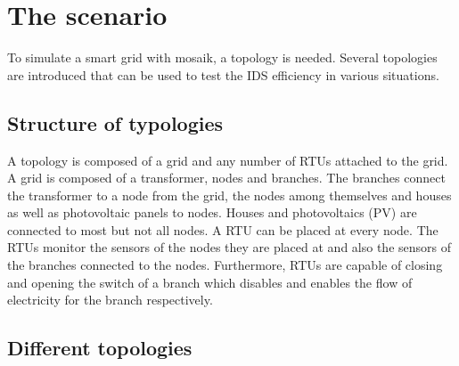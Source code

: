 \documentclass[conference]{IEEEtran}
\begin{document}
\section{The scenario}
	
	To simulate a smart grid with mosaik, a topology is needed. Several topologies are introduced that can be used to test the IDS efficiency in various situations.
	
	\subsection{Structure of typologies}
	
		A topology is composed of a grid and any number of RTUs attached to the grid. A grid is composed of a transformer, nodes and branches. The branches connect the transformer to a node from the grid, the nodes among themselves and houses as well as photovoltaic panels to nodes. Houses and photovoltaics (PV) are connected to most but not all nodes. A RTU can be placed at every node. The RTUs monitor the sensors of the nodes they are placed at and also the sensors of the branches connected to the nodes. Furthermore, RTUs are capable of closing and opening the switch of a branch which disables and enables the flow of electricity for the branch respectively.
		
	\subsection{Different topologies}
		
\end{document}

